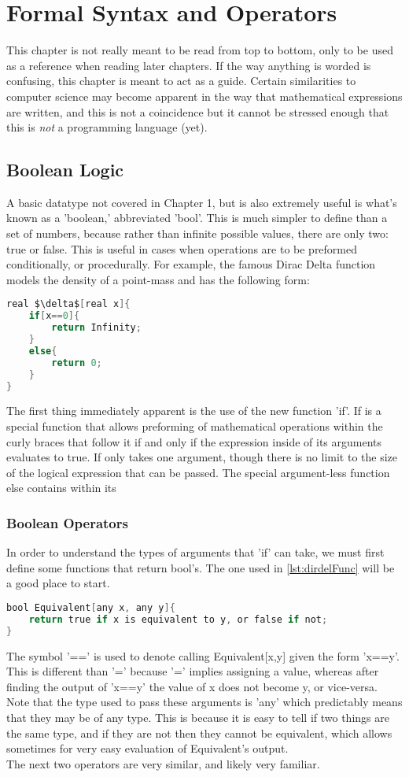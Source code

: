 \chapter{Formal Syntax and Operators}
This chapter is not really meant to be read from top to bottom, only to be used as a reference when reading later chapters. If the way anything is worded is confusing, this chapter is meant to act as a guide. Certain similarities to computer science may become apparent in the way that mathematical expressions are written, and this is not a coincidence but it cannot be stressed enough that this is \emph{not} a programming language (yet).

\section{Boolean Logic}
A basic datatype not covered in Chapter 1, but is also extremely useful is what's known as a 'boolean,' abbreviated 'bool'. This is much simpler to define than a set of numbers, because rather than infinite possible values, there are only two: true or false. This is useful in cases when operations are to be preformed conditionally, or procedurally. For example, the famous Dirac Delta function models the density of a point-mass and has the following form:
\begin{lstlisting}[language=C,caption=Dirac Delta Function,label=lst:dirdelFunc,mathescape]
real $\delta$[real x]{
	if[x==0]{
		return Infinity;
	}
	else{
		return 0;
	}
}
\end{lstlisting}
The first thing immediately apparent is the use of the new function 'if'. If is a special function that allows preforming of mathematical operations within the curly braces that follow it if and only if the expression inside of its arguments evaluates to true. If only takes one argument, though there is no limit to the size of the logical expression that can be passed. The special argument-less function else contains within its 
\subsection{Boolean Operators}
In order to understand the types of arguments that 'if' can take, we must first define some functions that return bool's. The one used in \ref{lst:dirdelFunc} will be a good place to start.
\begin{lstlisting}[language=C,caption=Equivalence Function,label=lst:equivFunc,mathescape]
bool Equivalent[any x, any y]{
	return true if x is equivalent to y, or false if not;
}
\end{lstlisting}
The symbol '==' is used to denote calling Equivalent[x,y] given the form 'x==y'. This is different than '=' because '=' implies assigning a value, whereas after finding the output of 'x==y' the value of x does not become y, or vice-versa. Note that the type used to pass these arguments is 'any' which predictably means that they may be of any type. This is because it is easy to tell if two things are the same type, and if they are not then they cannot be equivalent, which allows sometimes for very easy evaluation of Equivalent's output. \\
The next two operators are very similar, and likely very familiar.
